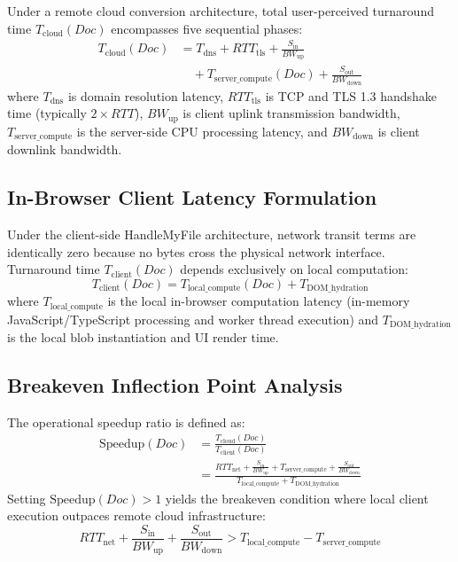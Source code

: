 \documentclass[journal]{IEEEtran}
\begin{document}
Under a remote cloud conversion architecture, total user-perceived turnaround time $T_{\text{cloud}}(Doc)$ encompasses five sequential phases:
\begin{equation}
\label{eq_tcloud}
\begin{split}
T_{\text{cloud}}(Doc) &= T_{\text{dns}} + RTT_{\text{tls}} + \frac{S_{\text{in}}}{BW_{\text{up}}} \\
&\quad + T_{\text{server\_compute}}(Doc) + \frac{S_{\text{out}}}{BW_{\text{down}}}
\end{split}
\end{equation}
where $T_{\text{dns}}$ is domain resolution latency, $RTT_{\text{tls}}$ is TCP and TLS 1.3 handshake time (typically $2 \times RTT$), $BW_{\text{up}}$ is client uplink transmission bandwidth, $T_{\text{server\_compute}}$ is the server-side CPU processing latency, and $BW_{\text{down}}$ is client downlink bandwidth.

\subsection{In-Browser Client Latency Formulation}
Under the client-side HandleMyFile architecture, network transit terms are identically zero because no bytes cross the physical network interface. Turnaround time $T_{\text{client}}(Doc)$ depends exclusively on local computation:
\begin{equation}
T_{\text{client}}(Doc) = T_{\text{local\_compute}}(Doc) + T_{\text{DOM\_hydration}}
\end{equation}
where $T_{\text{local\_compute}}$ is the local in-browser computation latency (in-memory JavaScript/TypeScript processing and worker thread execution) and $T_{\text{DOM\_hydration}}$ is the local blob instantiation and UI render time.

\subsection{Breakeven Inflection Point Analysis}
The operational speedup ratio is defined as:
\begin{equation}
\label{eq_speedup}
\begin{split}
\text{Speedup}(Doc) &= \frac{T_{\text{cloud}}(Doc)}{T_{\text{client}}(Doc)} \\
&= \frac{RTT_{\text{net}} + \frac{S_{\text{in}}}{BW_{\text{up}}} + T_{\text{server\_compute}} + \frac{S_{\text{out}}}{BW_{\text{down}}}}{T_{\text{local\_compute}} + T_{\text{DOM\_hydration}}}
\end{split}
\end{equation}
Setting $\text{Speedup}(Doc) > 1$ yields the breakeven condition where local client execution outpaces remote cloud infrastructure:
\begin{equation}
RTT_{\text{net}} + \frac{S_{\text{in}}}{BW_{\text{up}}} + \frac{S_{\text{out}}}{BW_{\text{down}}} > T_{\text{local\_compute}} - T_{\text{server\_compute}}
\end{equation}
\end{document}

